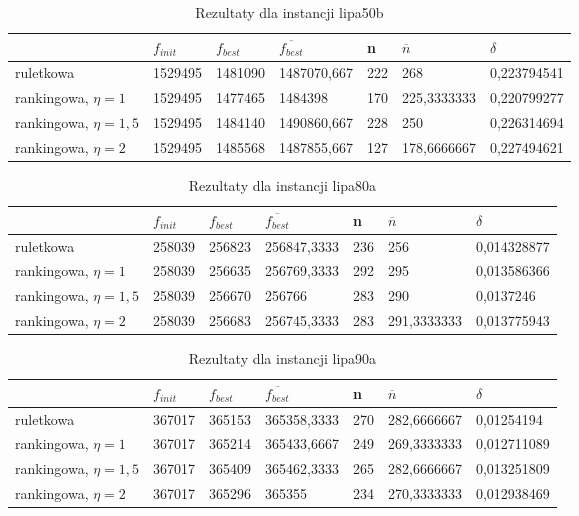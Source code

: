 \begin{table}[H]
\label{T5_lipa50b}
\begin{tabular}{l l l l l l l}
\hline
 & $f_{init}$ & $f_{best}$ & $\overline{f_{best}}$ & n & $\overline{n}$ & $\delta$ \\
\hline
ruletkowa & 1529495	 & 1481090 & 1487070,667 & 222 & 268 & 0,223794541\\
rankingowa, $\eta = 1$ & 1529495 & 1477465 & 1484398 & 170 & 225,3333333 & 0,220799277\\
rankingowa, $\eta = 1,5$ & 1529495 & 1484140 & 1490860,667 & 228 & 250 & 0,226314694\\
rankingowa, $\eta = 2$ & 1529495 & 1485568 & 1487855,667 & 127 & 178,6666667 & 0,227494621\\
\hline
\end{tabular}
\caption{Rezultaty dla instancji lipa50b}
\end{table}

\begin{table}[H]
\label{T5_lipa80a}
\begin{tabular}{l l l l l l l}
\hline
 & $f_{init}$ & $f_{best}$ & $\overline{f_{best}}$ & n & $\overline{n}$ & $\delta$ \\
\hline
ruletkowa & 258039 & 256823 & 256847,3333 & 236 & 256 & 0,014328877\\
rankingowa, $\eta = 1$ & 258039 & 256635 & 256769,3333 & 292 & 295 & 0,013586366\\
rankingowa, $\eta = 1,5$ & 258039 & 256670 & 256766 & 283 & 290 & 0,0137246\\
rankingowa, $\eta = 2$ & 258039 & 256683 & 256745,3333 & 283 & 291,3333333 & 0,013775943\\
\hline
\end{tabular}
\caption{Rezultaty dla instancji lipa80a}
\end{table}

\begin{table}[H]
\label{T5_lipa90a}
\begin{tabular}{l l l l l l l}
\hline
 & $f_{init}$ & $f_{best}$ & $\overline{f_{best}}$ & n & $\overline{n}$ & $\delta$ \\
\hline
ruletkowa & 367017 & 365153 & 365358,3333 & 270 & 282,6666667 & 0,01254194\\
rankingowa, $\eta = 1$ & 367017 & 365214 & 365433,6667 & 249 & 269,3333333 & 0,012711089\\
rankingowa, $\eta = 1,5$ & 367017 & 365409 & 365462,3333 & 265 & 282,6666667 & 0,013251809\\
rankingowa, $\eta = 2$ & 367017 & 365296 & 365355 & 234 & 270,3333333 & 0,012938469\\
\hline
\end{tabular}
\caption{Rezultaty dla instancji lipa90a}
\end{table}